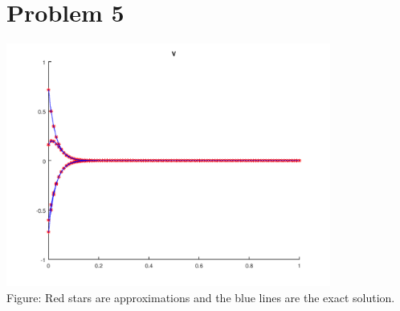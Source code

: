 \documentclass{article}
\begin{document}
\section*{Problem 5}
\includegraphics[height=8cm]{problem5.png}\\
Figure: Red stars are approximations and the blue lines are the exact solution. 
\end{document}
